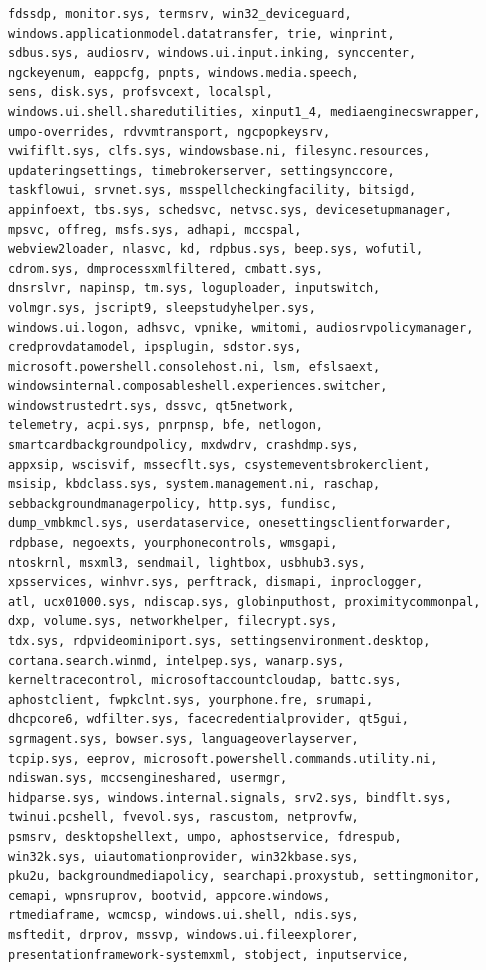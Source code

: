 \documentclass[a4paper,twoside,12pt]{book}
\begin{document}
\begin{appendices}
\begin{lstlisting}[label={lst:dlls},caption={All gathered DLL's},escapeinside=``,basicstyle=\tiny,breaklines=true]
fdssdp, monitor.sys, termsrv, win32_deviceguard, 
windows.applicationmodel.datatransfer, trie, winprint, 
sdbus.sys, audiosrv, windows.ui.input.inking, synccenter, 
ngckeyenum, eappcfg, pnpts, windows.media.speech, 
sens, disk.sys, profsvcext, localspl, 
windows.ui.shell.sharedutilities, xinput1_4, mediaenginecswrapper, 
umpo-overrides, rdvvmtransport, ngcpopkeysrv, 
vwififlt.sys, clfs.sys, windowsbase.ni, filesync.resources, 
updateringsettings, timebrokerserver, settingsynccore, 
taskflowui, srvnet.sys, msspellcheckingfacility, bitsigd, 
appinfoext, tbs.sys, schedsvc, netvsc.sys, devicesetupmanager, 
mpsvc, offreg, msfs.sys, adhapi, mccspal, 
webview2loader, nlasvc, kd, rdpbus.sys, beep.sys, wofutil, 
cdrom.sys, dmprocessxmlfiltered, cmbatt.sys, 
dnsrslvr, napinsp, tm.sys, loguploader, inputswitch, 
volmgr.sys, jscript9, sleepstudyhelper.sys, 
windows.ui.logon, adhsvc, vpnike, wmitomi, audiosrvpolicymanager, 
credprovdatamodel, ipsplugin, sdstor.sys, 
microsoft.powershell.consolehost.ni, lsm, efslsaext, 
windowsinternal.composableshell.experiences.switcher, 
windowstrustedrt.sys, dssvc, qt5network, 
telemetry, acpi.sys, pnrpnsp, bfe, netlogon, 
smartcardbackgroundpolicy, mxdwdrv, crashdmp.sys, 
appxsip, wscisvif, mssecflt.sys, csystemeventsbrokerclient, 
msisip, kbdclass.sys, system.management.ni, raschap, 
sebbackgroundmanagerpolicy, http.sys, fundisc, 
dump_vmbkmcl.sys, userdataservice, onesettingsclientforwarder, 
rdpbase, negoexts, yourphonecontrols, wmsgapi, 
ntoskrnl, msxml3, sendmail, lightbox, usbhub3.sys, 
xpsservices, winhvr.sys, perftrack, dismapi, inproclogger, 
atl, ucx01000.sys, ndiscap.sys, globinputhost, proximitycommonpal, 
dxp, volume.sys, networkhelper, filecrypt.sys, 
tdx.sys, rdpvideominiport.sys, settingsenvironment.desktop, 
cortana.search.winmd, intelpep.sys, wanarp.sys, 
kerneltracecontrol, microsoftaccountcloudap, battc.sys, 
aphostclient, fwpkclnt.sys, yourphone.fre, srumapi, 
dhcpcore6, wdfilter.sys, facecredentialprovider, qt5gui, 
sgrmagent.sys, bowser.sys, languageoverlayserver, 
tcpip.sys, eeprov, microsoft.powershell.commands.utility.ni, 
ndiswan.sys, mccsengineshared, usermgr, 
hidparse.sys, windows.internal.signals, srv2.sys, bindflt.sys, 
twinui.pcshell, fvevol.sys, rascustom, netprovfw, 
psmsrv, desktopshellext, umpo, aphostservice, fdrespub, 
win32k.sys, uiautomationprovider, win32kbase.sys, 
pku2u, backgroundmediapolicy, searchapi.proxystub, settingmonitor, 
cemapi, wpnsruprov, bootvid, appcore.windows, 
rtmediaframe, wcmcsp, windows.ui.shell, ndis.sys, 
msftedit, drprov, mssvp, windows.ui.fileexplorer, 
presentationframework-systemxml, stobject, inputservice, 

\end{lstlisting}
\end{appendices}
\end{document}
